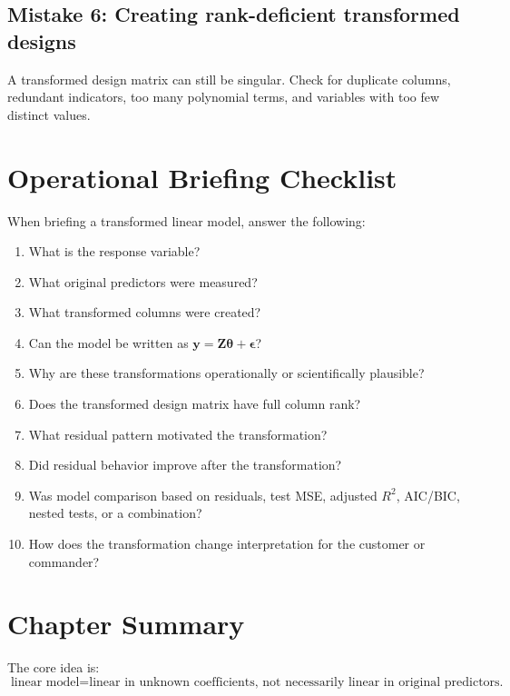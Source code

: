 {\subsection*{Mistake 6: Creating rank-deficient transformed designs}

A transformed design matrix can still be singular.  Check for duplicate columns, redundant indicators, too many polynomial terms, and variables with too few distinct values.

\section{Operational Briefing Checklist}

When briefing a transformed linear model, answer the following:
\begin{enumerate}
  \item What is the response variable?
  \item What original predictors were measured?
  \item What transformed columns were created?
  \item Can the model be written as \(\mathbf{y}=\mathbf{Z}\boldsymbol{\theta}+\boldsymbol{\epsilon}\)?
  \item Why are these transformations operationally or scientifically plausible?
  \item Does the transformed design matrix have full column rank?
  \item What residual pattern motivated the transformation?
  \item Did residual behavior improve after the transformation?
  \item Was model comparison based on residuals, test MSE, adjusted \(R^2\), AIC/BIC, nested tests, or a combination?
  \item How does the transformation change interpretation for the customer or commander?
\end{enumerate}

\section{Chapter Summary}

The core idea is:
\begin{equation}
  \boxed{
  \text{linear model} = \text{linear in unknown coefficients, not necessarily linear in original predictors.}
  }
\end{equation}

}
